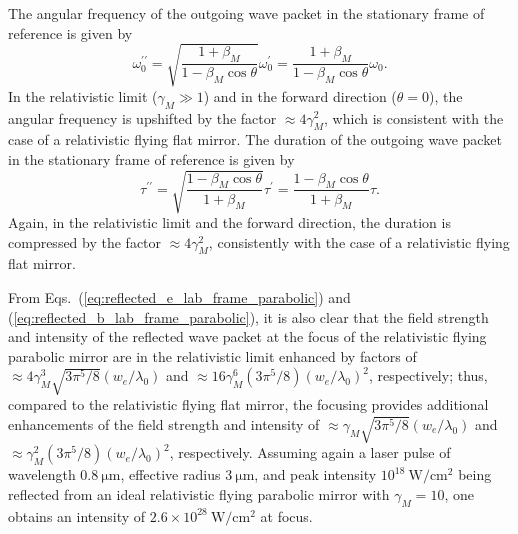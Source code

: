 \documentclass[10pt, a4paper, twoside, openright]{report}
\begin{document}
The angular frequency of the outgoing wave packet in the stationary frame of reference is given by \cite{Jeong2021}
\begin{equation}\label{eq:upshift_factor_parabolic}
	\omega_0^{\prime \prime} = \sqrt{ \frac{1 + \beta_M}{1 - \beta_M \cos \theta}} \omega_0^{\prime} = \frac{1 + \beta_M}{1 - \beta_M \cos \theta} \omega_0.
\end{equation}
In the relativistic limit ($ \gamma_M \gg 1 $) and in the forward direction ($ \theta = 0 $), the angular frequency is upshifted by the factor $ \approx 4 \gamma_M^2 $, which is consistent with the case of a relativistic flying flat mirror. The duration of the outgoing wave packet in the stationary frame of reference is given by \cite{Jeong2021}
\begin{equation}\label{eq:compression_factor_parabolic}
	\tau^{\prime \prime} = \sqrt{\frac{1 - \beta_M \cos \theta}{1 + \beta_M}} \tau^{\prime} = \frac{1 - \beta_M \cos \theta}{1 + \beta_M} \tau.
\end{equation}
Again, in the relativistic limit and the forward direction, the duration is compressed by the factor $ \approx 4 \gamma_M^2 $, consistently with the case of a relativistic flying flat mirror.

From Eqs.~(\ref{eq:reflected_e_lab_frame_parabolic}) and (\ref{eq:reflected_b_lab_frame_parabolic}), it is also clear that the field strength and intensity of the reflected wave packet at the focus of the relativistic flying parabolic mirror are in the relativistic limit enhanced by factors of $ \approx 4 \gamma_M^3 \sqrt{3 \pi^5 / 8} \left( w_e / \lambda_0 \right) $ and $ \approx 16 \gamma_M^6 \left( 3 \pi^5 / 8 \right) \left( w_e / \lambda_0 \right)^2 $, respectively; thus, compared to the relativistic flying flat mirror, the focusing provides additional enhancements of the field strength and intensity of $ \approx \gamma_M \sqrt{3 \pi^5 / 8} \left( w_e / \lambda_0 \right) $ and $ \approx \gamma_M^2 \left( 3 \pi^5 / 8 \right) \left( w_e / \lambda_0 \right)^2 $, respectively. Assuming again a laser pulse of wavelength $ 0.8 \ \mathrm{\mu m} $, effective radius $ 3 \ \mathrm{\mu m} $, and peak intensity $ 10^{18} \ \mathrm{W / cm^2} $ being reflected from an ideal relativistic flying parabolic mirror with $ \gamma_M = 10 $, one obtains an intensity of $ 2.6 \times 10^{28} \ \mathrm{W / cm^2} $ at focus.
\end{document}
